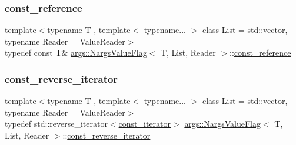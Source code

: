 \mbox{\label{classargs_1_1_nargs_value_flag_af8e749af247a14c97883ae90294ef970}} 
\subsubsection{\texorpdfstring{const\+\_\+reference}{const\_reference}}
{\footnotesize\ttfamily template$<$typename T , template$<$ typename... $>$ class List = std\+::vector, typename Reader  = Value\+Reader$>$ \\
typedef const T\& \hyperlink{classargs_1_1_nargs_value_flag}{args\+::\+Nargs\+Value\+Flag}$<$ T, List, Reader $>$\+::\hyperlink{classargs_1_1_nargs_value_flag_af8e749af247a14c97883ae90294ef970}{const\+\_\+reference}}

\mbox{\label{classargs_1_1_nargs_value_flag_a5c004f10973a047ecd2067454e536d41}} 
\subsubsection{\texorpdfstring{const\+\_\+reverse\+\_\+iterator}{const\_reverse\_iterator}}
{\footnotesize\ttfamily template$<$typename T , template$<$ typename... $>$ class List = std\+::vector, typename Reader  = Value\+Reader$>$ \\
typedef std\+::reverse\+\_\+iterator$<$\hyperlink{classargs_1_1_nargs_value_flag_a115760faf263d007148b30c99d8e6bdc}{const\+\_\+iterator}$>$ \hyperlink{classargs_1_1_nargs_value_flag}{args\+::\+Nargs\+Value\+Flag}$<$ T, List, Reader $>$\+::\hyperlink{classargs_1_1_nargs_value_flag_a5c004f10973a047ecd2067454e536d41}{const\+\_\+reverse\+\_\+iterator}}

\mbox{\label{classargs_1_1_nargs_value_flag_a27e748faa4e5ce69baf05a256e351d42}} 
